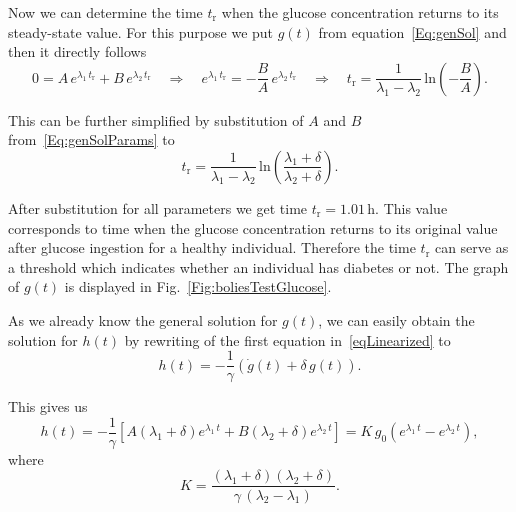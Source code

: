 \documentclass{article}
\providecommand{\m}[1]{\ensuremath{\mathrm{#1}}}
\begin{document}
Now we can determine the time $t_\m{r}$ when the glucose concentration returns to its steady-state value. For this purpose we put $g(t)$ from equation~\eqref{Eq:genSol} and then it directly follows
\begin{equation*}
	0 = A\,e^{\lambda_1 \, t_\m{r}} + B\,e^{\lambda_2 \, t_\m{r}}		\quad\Rightarrow\quad
	e^{\lambda_1\,t_\m{r}} = -\frac{B}{A}\,e^{\lambda_2\,t_\m{r}} 	\quad\Rightarrow\quad
	t_\m{r} = \frac{1}{\lambda_1 - \lambda_2}\,\m{ln}\left(-\frac{B}{A}\right).
\end{equation*}


This can be further simplified by substitution of $A$ and $B$ from~\eqref{Eq:genSolParams} to
\begin{equation}
	t_\m{r} = \frac{1}{\lambda_1 - \lambda_2}\,\m{ln}\left(\frac{\lambda_1+\delta}{\lambda_2+\delta}\right).
\end{equation}

After substitution for all parameters we get time $t_\m{r}=1.01\,\si{\hour}$. This value corresponds to time when the glucose concentration returns to its original value after glucose ingestion for a healthy individual. Therefore the time $t_\m{r}$ can serve as a threshold which indicates whether an individual has diabetes or not. The graph of $g(t)$ is displayed in Fig.~\ref{Fig:boliesTestGlucose}.

As we already know the general solution for $g(t)$, we can easily obtain the solution for $h(t)$ by rewriting of the first equation in~\eqref{eqLinearized} to
\begin{equation}
	h(t) = -\frac{1}{\gamma}\left( \dot{g}(t) + \delta\,g(t)\right).
\end{equation}

This gives us
\begin{equation}
	h(t) = -\frac{1}{\gamma}\left[   A(\lambda_1 + \delta)e^{\lambda_1\,t} + B(\lambda_2 + \delta)e^{\lambda_2\,t}  \right] = K\,g_0 \left(e^{\lambda_1\,t} - e^{\lambda_2\,t} \right),
\end{equation}
where $$K=\frac{(\lambda_1+\delta)(\lambda_2+\delta)}{\gamma\,(\lambda_2-\lambda_1)}.$$
\end{document}
